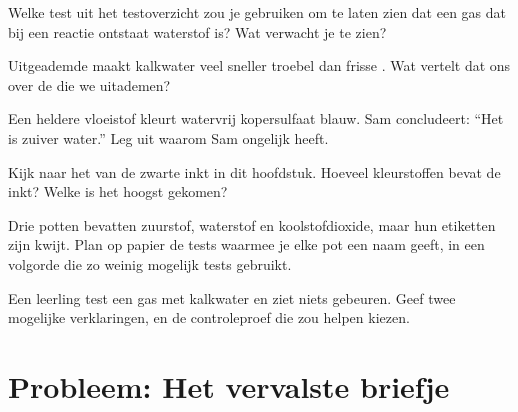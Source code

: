 \begin{exercise}[$\star\star$]\label{exo:g7:identifying-substances:7}
Welke test uit het testoverzicht zou je gebruiken om te laten zien dat
een gas dat bij een reactie ontstaat waterstof is? Wat verwacht je te
zien?
\end{exercise}

\begin{exercise}[$\star\star$]\label{exo:g7:identifying-substances:8}
Uitgeademde  maakt kalkwater veel sneller troebel dan frisse .
Wat vertelt dat ons over de  die we uitademen?
\end{exercise}

\begin{exercise}[$\star\star$]\label{exo:g7:identifying-substances:9}
Een heldere vloeistof kleurt watervrij kopersulfaat blauw. Sam
concludeert: ``Het is zuiver water.'' Leg uit waarom Sam ongelijk heeft.
\end{exercise}

\begin{exercise}[$\star\star$]\label{exo:g7:identifying-substances:10}
Kijk naar het  van de zwarte inkt in dit hoofdstuk. Hoeveel
kleurstoffen bevat de inkt? Welke is het hoogst gekomen?
\end{exercise}

\begin{exercise}[$\star\star\star$]\label{exo:g7:identifying-substances:11}
Drie potten bevatten zuurstof, waterstof en koolstofdioxide, maar hun
etiketten zijn kwijt. Plan op papier de tests waarmee je elke pot een
naam geeft, in een volgorde die zo weinig mogelijk tests gebruikt.
\end{exercise}

\begin{exercise}[$\star\star\star$]\label{exo:g7:identifying-substances:12}
Een leerling test een gas met kalkwater en ziet niets gebeuren. Geef twee
mogelijke verklaringen, en de controleproef die zou helpen kiezen.
\end{exercise}

\section{Probleem: Het vervalste briefje}

